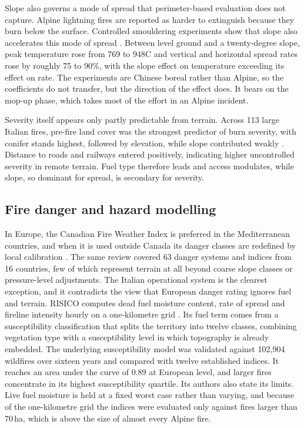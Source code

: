 \documentclass[11pt,a4paper]{article}
\begin{document}
Slope also governs a mode of spread that perimeter-based evaluation does not capture. Alpine lightning fires are reported as harder to extinguish because they burn below the surface. Controlled smouldering experiments show that slope also accelerates this mode of spread \citep{shan_influence_2024}. Between level ground and a twenty-degree slope, peak temperature rose from 769 to 948\degree{}C and vertical and horizontal spread rates rose by roughly 75 to 90\%, with the slope effect on temperature exceeding its effect on rate. The experiments are Chinese boreal rather than Alpine, so the coefficients do not transfer, but the direction of the effect does. It bears on the mop-up phase, which takes most of the effort in an Alpine incident.

Severity itself appears only partly predictable from terrain. Across 113 large Italian fires, pre-fire land cover was the strongest predictor of burn severity, with conifer stands highest, followed by elevation, while slope contributed weakly \citep{malandra_burn_2022}. Distance to roads and railways entered positively, indicating higher uncontrolled severity in remote terrain. Fuel type therefore leads and access modulates, while slope, so dominant for spread, is secondary for severity.

\subsection{Fire danger and hazard modelling}

In Europe, the Canadian Fire Weather Index is preferred in the Mediterranean countries, and when it is used outside Canada its danger classes are redefined by local calibration \citep{zacharakis_environmental_2023}. The same review covered 63 danger systems and indices from 16 countries, few of which represent terrain at all beyond coarse slope classes or pressure-level adjustments. The Italian operational system is the clearest exception, and it contradicts the view that European danger rating ignores fuel and terrain. RISICO computes dead fuel moisture content, rate of spread and fireline intensity hourly on a one-kilometre grid \citep{perello_fuelaware_2025}. Its fuel term comes from a susceptibility classification that splits the territory into twelve classes, combining vegetation type with a susceptibility level in which topography is already embedded. The underlying susceptibility model was validated against 102{,}904 wildfires over sixteen years and compared with twelve established indices. It reaches an area under the curve of 0.89 at European level, and larger fires concentrate in its highest susceptibility quartile. Its authors also state its limits. Live fuel moisture is held at a fixed worst case rather than varying, and because of the one-kilometre grid the indices were evaluated only against fires larger than 70\,ha, which is above the size of almost every Alpine fire.
\end{document}
